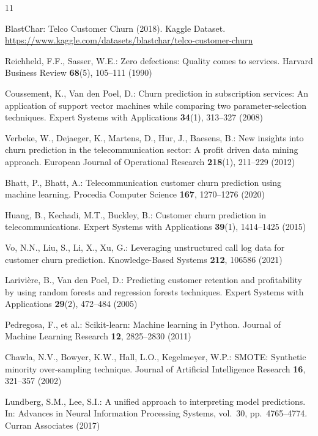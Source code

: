 \documentclass{llncs}
\begin{document}
\begin{thebibliography}{11}

BlastChar:
Telco Customer Churn (2018).
Kaggle Dataset.
\url{https://www.kaggle.com/datasets/blastchar/telco-customer-churn}

Reichheld, F.F., Sasser, W.E.:
Zero defections: Quality comes to services.
Harvard Business Review \textbf{68}(5), 105--111 (1990)

Coussement, K., Van den Poel, D.:
Churn prediction in subscription services: An application of support
vector machines while comparing two parameter-selection techniques.
Expert Systems with Applications \textbf{34}(1), 313--327 (2008)

Verbeke, W., Dejaeger, K., Martens, D., Hur, J., Baesens, B.:
New insights into churn prediction in the telecommunication sector:
A profit driven data mining approach.
European Journal of Operational Research \textbf{218}(1), 211--229 (2012)

Bhatt, P., Bhatt, A.:
Telecommunication customer churn prediction using machine learning.
Procedia Computer Science \textbf{167}, 1270--1276 (2020)

Huang, B., Kechadi, M.T., Buckley, B.:
Customer churn prediction in telecommunications.
Expert Systems with Applications \textbf{39}(1), 1414--1425 (2015)

Vo, N.N., Liu, S., Li, X., Xu, G.:
Leveraging unstructured call log data for customer churn prediction.
Knowledge-Based Systems \textbf{212}, 106586 (2021)

Larivière, B., Van den Poel, D.:
Predicting customer retention and profitability by using random forests
and regression forests techniques.
Expert Systems with Applications \textbf{29}(2), 472--484 (2005)

Pedregosa, F., et al.:
Scikit-learn: Machine learning in Python.
Journal of Machine Learning Research \textbf{12}, 2825--2830 (2011)

Chawla, N.V., Bowyer, K.W., Hall, L.O., Kegelmeyer, W.P.:
SMOTE: Synthetic minority over-sampling technique.
Journal of Artificial Intelligence Research \textbf{16}, 321--357 (2002)

Lundberg, S.M., Lee, S.I.:
A unified approach to interpreting model predictions.
In: Advances in Neural Information Processing Systems, vol.~30,
pp.~4765--4774. Curran Associates (2017)

\end{thebibliography}
\end{document}
